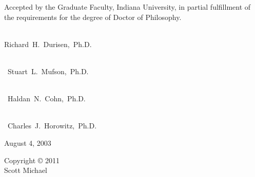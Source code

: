 \vspace*{1.0in}
\begin{spacing}{1.0}
Accepted by the Graduate Faculty, Indiana University, in partial
fulfillment of the requirements for the degree of Doctor of
Philosophy.
\vspace{1.25in}

\noindent
\hbox{\hspace{2.4in} \underbar{\hbox{\hspace{3.25in}}}} \\
\hbox{\hspace{2.4in}Richard H. Durisen, Ph.D.}

\vspace{0.75in}

\noindent
\hbox{\hspace{2.4in} \underbar{\hbox{\hspace{3.25in}}}} \\
\hbox{\hspace{2.4in} Stuart L. Mufson, Ph.D.}

\vspace{0.75in}

\noindent
\hbox{\hspace{2.4in} \underbar{\hbox{\hspace{3.25in}}}} \\
\hbox{\hspace{2.4in} Haldan N. Cohn, Ph.D.}

\vspace{0.75in}

\noindent
\hbox{\hspace{2.4in} \underbar{\hbox{\hspace{3.25in}}}} \\
\hbox{\hspace{2.4in} Charles J. Horowitz, Ph.D.}

\vspace{1.0in}

\noindent
August 4, 2003
\end{spacing}

\clearpage

%
%
%

\vspace*{3.5in}

\begin{spacing}{1.0}
\begin{center}
Copyright {\copyright} 2011 \\
Scott Michael \\
\end{center}
\end{spacing}

